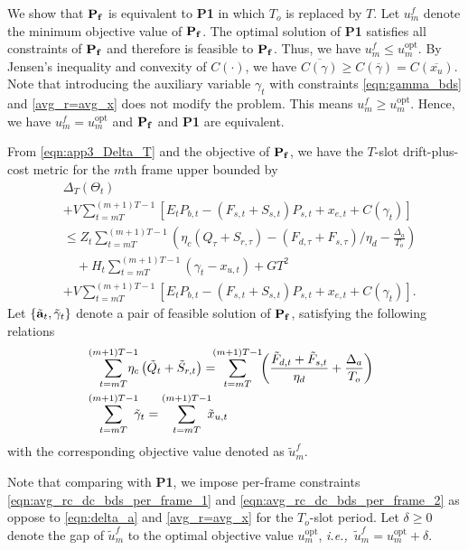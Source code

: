 \documentclass[journal]{IEEEtran}
\def\abf{{\bf a}}
\def\ie{{\it i.e.,\ \/}}
\def\nn{\nonumber}
\begin{document}
We show that ${\bf \textrm{\bf P}_f}$ is equivalent to {\bf P1} in which $T_o$ is replaced by $T$.
Let $u_m^f$ denote the minimum objective value of ${\bf \textrm{\bf P}_f}$. The optimal solution of {\bf P1} satisfies all constraints of ${\bf \textrm{\bf P}_f}$ and therefore is feasible to ${\bf \textrm{\bf P}_f}$. Thus, we have $u_m^f\leq u_m^\textrm{opt}$. By Jensen's inequality and convexity of $C(\cdot)$, we have $\overline{C(\gamma)}\geq C(\overline{\gamma})=C(\overline{x_u})$.
Note that introducing the auxiliary variable $\gamma_t$ with constraints \eqref{eqn:gamma_bds} and \eqref{avg_r=avg_x} does not modify the problem.
This means $u_m^f\ge u_m^\textrm{opt}$.
Hence, we have $u_m^f= u_m^\textrm{opt}$ and ${\bf \textrm{\bf P}_f}$ and {\bf P1} are equivalent.

From \eqref{eqn:app3_Delta_T} and the objective of ${\bf \textrm{\bf P}_f}$, we have the $T$-slot drift-plus-cost metric for the $m$th frame upper bounded by
\begin{align}\label{eqn:T slot drift plus penalty}
&\Delta_T(\Theta_t)\nn\\
& +V\!\!\!\sum_{t=mT}^{(m+1)T-1}[E_tP_{b,t}-(F_{s,t}+S_{s,t})P_{s,t}+x_{e,t}+C(\gamma_t)]\nn\\
&\leq Z_{t\!\!\!}\sum_{t=mT}^{(m+1)T-1}\!\!\!\left(\eta_c(Q_\tau+S_{r,\tau})-(F_{d,\tau}+F_{s,\tau})/\eta_d-\frac{\Delta_a}{T_o}\right)\nn\\
&\quad+H_{t}\!\!\!\sum_{t=mT}^{(m+1)T-1}\!\!\!\left(\gamma_t-x_{u,t}\right)+G T^2\nn\\
&+V\!\!\!\!\!\sum_{t=mT}^{(m+1)T-1}\!\!\!\!\![E_tP_{b,t}-(F_{s,t}+S_{s,t})P_{s,t}+x_{e,t}+C(\gamma_t)].
\end{align}
Let $\{\tilde{\abf}_t,\tilde{\gamma}_t\}$ denote a pair of feasible solution of ${\bf \textrm{\bf P}_f}$, satisfying the following relations
\begin{align}
&\hspace*{-.7em}\sum_{t=mT}^{(m+1)T-1}\!\!\!\!\!\! \eta_c\left(\tilde{Q}_t+\tilde{S}_{r,t}\right)=\!\!\!\sum_{t=mT}^{(m+1)T-1}\!\!\left(\frac{\tilde{F}_{d,t}+\tilde{F}_{s,t}}{\eta_d}+\frac{\Delta_a}{T_o}\right)\label{eqn:avg_rc_dc_bds_per_frame_1}\\
&\hspace*{-.7em}\sum_{t=mT}^{(m+1)T-1}\!\!\!\tilde{\gamma}_t=\sum_{t=mT}^{(m+1)T-1}\!\!\!\tilde{x}_{u,t}\label{eqn:avg_rc_dc_bds_per_frame_2}
\end{align}
with the corresponding objective value denoted as $\tilde{u}^f_m$.

Note that comparing with {\bf P1}, we impose per-frame constraints \eqref{eqn:avg_rc_dc_bds_per_frame_1} and \eqref{eqn:avg_rc_dc_bds_per_frame_2} as oppose to \eqref{eqn:delta_a} and \eqref{avg_r=avg_x} for the $T_o$-slot period.
Let $\delta\geq 0$ denote the gap of $\tilde{u}^f_m$ to the optimal objective value $u_m^\textrm{opt}$, \ie $\tilde{u}^f_m=u_m^\textrm{opt}+\delta$.
\end{document}
